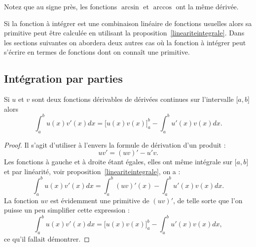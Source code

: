 Notez que au signe près, les fonctions \( \arcsin \) et \( \arccos\) ont la même dérivée.

Si la fonction à intégrer est une combinaison linéaire de fonctions usuelles alors sa primitive peut \^etre calculée en utilisant la proposition~\ref{lineariteintegrale}. Dans les sections suivantes on abordera deux autres cas où la fonction à intégrer peut s'écrire en termes de fonctions dont on connaît une primitive.

\subsection{Intégration par parties}

\begin{proposition}     \label{PROPooRLFIooQHnyJY}
	Si \( u\) et \( v\) sont deux fonctions dérivables de dérivées continues sur l'intervalle \( \mathopen[ a , b \mathclose]\) alors
	\begin{equation}        \label{EQooKISBooQvGMQT}
		\int_a^b u(x)v'(x)dx=\big[ u(x)v(x) \big]_a^b-\int_a^bu'(x)v(x)dx.
	\end{equation}
\end{proposition}

\begin{proof}
	Il s'agit d'utiliser à l'envers la formule de dérivation d'un produit :
	\begin{equation}
		uv'=(uv)'-u'v.
	\end{equation}
	Les fonctions à gauche et à droite étant égales, elles ont même intégrale sur \( \mathopen[ a , b \mathclose]\) et par linéarité, voir  proposition~\ref{lineariteintegrale}, on a :
	\begin{equation}
		\int_a^b u(x)v'(x)dx=\int_a^b (uv)'(x)-\int_a^b u'(x)v(x)dx.
	\end{equation}
	La fonction \( uv\) est évidemment une primitive de \( (uv)'\), de telle sorte que l'on puisse un peu simplifier cette expression :
	\begin{equation}
		\int_a^b u(x)v'(x)dx= \Big[ u(x)v(x) \Big]_a^b -\int_a^b u'(x)v(x)dx,
	\end{equation}
	ce qu'il fallait démontrer.
\end{proof}

